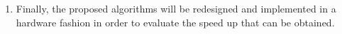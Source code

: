 \documentclass[authoryear,11pt]{elsarticle}
\begin{document}
\begin{enumerate}
  	\item Finally, the proposed algorithms will be redesigned and implemented in a hardware fashion in order to 
  		  evaluate the speed up that can be obtained.
\end{enumerate}

\clearpage 
\end{document}
